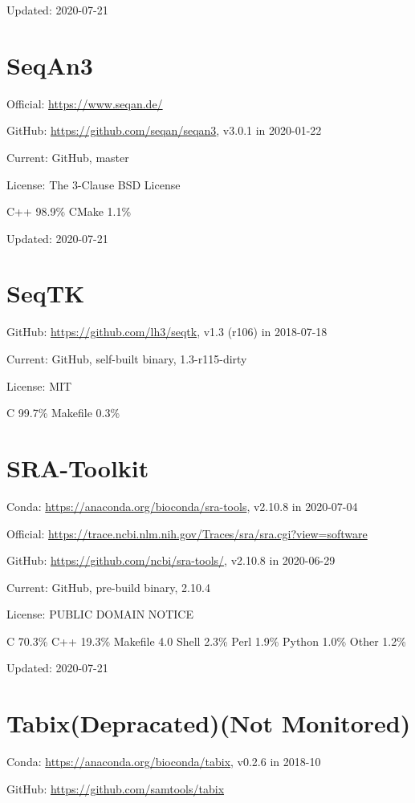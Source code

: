\documentclass[]{article}
\newcommand{\nm}{{\color{red}(Not Monitored)}}
\newcommand{\de}{{\color{red}(Depracated)}}
\begin{document}
Updated: 2020-07-21

\section{SeqAn3}

Official: \url{https://www.seqan.de/}

GitHub: \url{https://github.com/seqan/seqan3}, v3.0.1 in 2020-01-22

Current: GitHub, master

License: The 3-Clause BSD License

C++ 98.9\% CMake 1.1\%

Updated: 2020-07-21

\section{SeqTK}

GitHub: \url{https://github.com/lh3/seqtk}, v1.3 (r106) in 2018-07-18

Current: GitHub, self-built binary, 1.3-r115-dirty

License: MIT

C 99.7\% Makefile 0.3\%

\section{SRA-Toolkit}

Conda: \url{https://anaconda.org/bioconda/sra-tools}, v2.10.8 in 2020-07-04

Official: \url{https://trace.ncbi.nlm.nih.gov/Traces/sra/sra.cgi?view=software}

GitHub: \url{https://github.com/ncbi/sra-tools/}, v2.10.8 in 2020-06-29

Current: GitHub, pre-build binary, 2.10.4

License: PUBLIC DOMAIN NOTICE

C 70.3\% C++ 19.3\% Makefile 4.0 Shell 2.3\% Perl 1.9\% Python 1.0\% Other 1.2\%

Updated: 2020-07-21

\section{Tabix\de\nm}

Conda: \url{https://anaconda.org/bioconda/tabix}, v0.2.6 in 2018-10

GitHub: \url{https://github.com/samtools/tabix}
\end{document}
